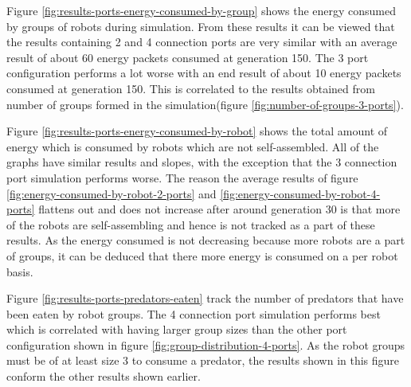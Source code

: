 Figure \ref{fig:results-ports-energy-consumed-by-group} shows the energy consumed by groups of robots during simulation.
From these results it can be viewed that the results containing 2 and 4 connection ports are very similar with an average result of about 60 energy packets consumed at generation 150.
The 3 port configuration performs a lot worse with an end result of about 10 energy packets consumed at generation 150.
This is correlated to the results obtained from number of groups formed in the simulation(figure \ref{fig:number-of-groups-3-ports}).


\vspace*{\fill}
\newpage
\vspace*{\fill}



Figure \ref{fig:results-ports-energy-consumed-by-robot} shows the total amount of energy which is consumed by robots which are not self-assembled.
All of the graphs have similar results and slopes, with the exception that the 3 connection port simulation performs worse.
The reason the average results of figure \ref{fig:energy-consumed-by-robot-2-ports} and \ref{fig:energy-consumed-by-robot-4-ports} flattens out and does not increase after around generation 30 is that more of the robots are self-assembling and hence is not tracked as a part of these results.
As the energy consumed is not decreasing because more robots are a part of groups, it can be deduced that there more energy is consumed on a per robot basis.

\vspace*{\fill}
\newpage
\vspace*{\fill}



Figure \ref{fig:results-ports-predators-eaten} track the number of predators that have been eaten by robot groups. 
The 4 connection port simulation performs best which is correlated with having larger group sizes than the other port configuration shown in figure \ref{fig:group-distribution-4-ports}.
As the robot groups must be of at least size 3 to consume a predator, the results shown in this figure conform the other results shown earlier.

\vspace*{\fill}
